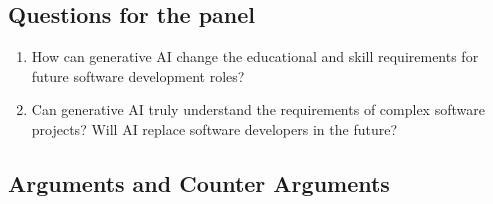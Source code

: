 \documentclass{article}
\begin{document}
\subsection{Questions for the panel}
\begin{enumerate}
    \item How can generative AI change the educational and skill requirements for future software development roles?
    \item Can generative AI truly understand the requirements of complex software projects? Will AI replace software developers in the future?
\end{enumerate}

\subsection{Arguments and Counter Arguments}
\end{document}
